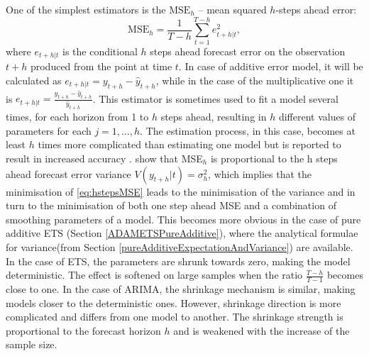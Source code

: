 \documentclass[
]{book}
\theoremstyle{definition}
\theoremstyle{definition}
\theoremstyle{definition}
\theoremstyle{definition}
\theoremstyle{remark}
\begin{document}
One of the simplest estimators is the \(\mathrm{MSE}_h\) -- mean squared \(h\)-steps ahead error:
\begin{equation}
    \mathrm{MSE}_h = \frac{1}{T-h} \sum_{t=1}^{T-h} e_{t+h|t}^2 ,
  \label{eq:hstepsMSE}
\end{equation}
where \(e_{t+h|t}\) is the conditional \(h\) steps ahead forecast error on the observation \(t+h\) produced from the point at time \(t\). In case of additive error model, it will be calculated as \(e_{t+h|t}=y_{t+h}-\hat{y}_{t+h}\), while in the case of the multiplicative one it is \(e_{t+h|t}=\frac{y_{t+h}-\hat{y}_{t+h}}{\hat{y}_{t+h}}\). This estimator is sometimes used to fit a model several times, for each horizon from 1 to \(h\) steps ahead, resulting in \(h\) different values of parameters for each \(j=1, \ldots, h\). The estimation process, in this case, becomes at least \(h\) times more complicated than estimating one model but is reported to result in increased accuracy \citep[see for example][]{kourentzes2019unconstraining}. \citet{Svetunkov2020Multistep} show that MSE\(_h\) is proportional to the h steps ahead forecast error variance \(V(y_{t+h}|t)=\sigma^2_{h}\), which implies that the minimisation of \eqref{eq:hstepsMSE} leads to the minimisation of the variance and in turn to the minimisation of both one step ahead MSE and a combination of smoothing parameters of a model. This becomes more obvious in the case of pure additive ETS (Section \ref{ADAMETSPureAdditive}), where the analytical formulae for variance(from Section \ref{pureAdditiveExpectationAndVariance}) are available. In the case of ETS, the parameters are shrunk towards zero, making the model deterministic. The effect is softened on large samples when the ratio \(\frac{T-h}{T-1}\) becomes close to one. In the case of ARIMA, the shrinkage mechanism is similar, making models closer to the deterministic ones. However, shrinkage direction is more complicated and differs from one model to another. The shrinkage strength is proportional to the forecast horizon \(h\) and is weakened with the increase of the sample size.
\end{document}
